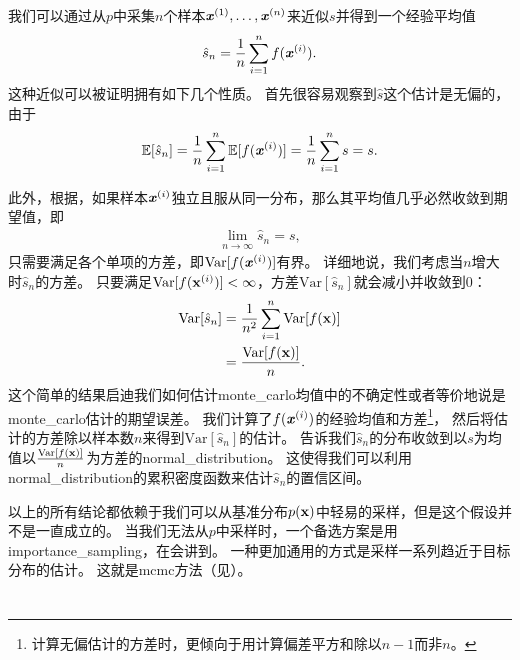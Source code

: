我们可以通过从$p$中采集$n$个样本$\boldsymbol{\mathit{x}}^{(1)},\ldots,\boldsymbol{\mathit{x}}^{(n)}$来近似$s$并得到一个经验平均值
\begin{align}
\hat{s}_n = \frac{1}{n}\sum_{i=1}^{n}f(\boldsymbol{\mathit{x}}^{(i)}).
\end{align}
这种近似可以被证明拥有如下几个性质。
首先很容易观察到$\hat{s}$这个估计是无偏的，由于
\begin{align}
\mathbb{E}[\hat{s}_n] = \frac{1}{n}\sum_{i=1}^{n}\mathbb{E}[f(\boldsymbol{\mathit{x}}^{(i)})] = \frac{1}{n}\sum_{i=1}^{n}s = s.
\end{align}

此外，根据，如果样本$\boldsymbol{\mathit{x}}^{(i)}$独立且服从同一分布，那么其平均值几乎必然收敛到期望值，即
\begin{align}
\lim_{n\xrightarrow{}\infty} \hat{s}_n = s,
\end{align}
只需要满足各个单项的方差，即$\text{Var}[f(\boldsymbol{\mathit{x}}^{(i)})]$有界。
详细地说，我们考虑当$n$增大时$\hat{s}_n$的方差。
只要满足$\text{Var}[f(\mathbf{x}^{(i)})]<\infty$，方差$\text{Var}[\hat{s}_n]$就会减小并收敛到$0$：
\begin{align}
\text{Var}[\hat{s}_n] & = \frac{1}{n^2}\sum_{i=1}^{n}\text{Var}[f(\mathbf{x})]\\
&  = \frac{\text{Var}[f(\mathbf{x})]}{n}.
\end{align}
这个简单的结果启迪我们如何估计\gls{monte_carlo}均值中的不确定性或者等价地说是\gls{monte_carlo}估计的期望误差。
我们计算了$f(\boldsymbol{\mathit{x}}^{(i)})$的经验均值和方差\footnote{计算无偏估计的方差时，更倾向于用计算偏差平方和除以$n-1$而非$n$。}，
然后将估计的方差除以样本数$n$来得到$\text{Var}[\hat{s}_n]$的估计。
告诉我们$\hat{s}_n$的分布收敛到以$s$为均值以$\frac{\text{Var}[f(\mathbf{x})]}{n}$为方差的\gls{normal_distribution}。
这使得我们可以利用\gls{normal_distribution}的累积密度函数来估计$\hat{s}_n$的置信区间。

以上的所有结论都依赖于我们可以从基准分布$p(\mathbf{x})$中轻易的采样，但是这个假设并不是一直成立的。
当我们无法从$p$中采样时，一个备选方案是用\gls{importance_sampling}，在会讲到。
一种更加通用的方式是采样一系列趋近于目标分布的估计。
这就是\gls{mcmc}方法（见）。

\section{}
\label{sec:importance_sampling_chap17}

